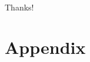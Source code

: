\documentclass[aspectratio=169]{beamer}
\begin{document}
\begin{frame}
    Thanks!
\end{frame}


\appendix

\renewcommand\thetable{\thesection.\arabic{table}} 
\renewcommand\thefigure{\thesection.\arabic{figure}} 
\setcounter{table}{0}
\setcounter{figure}{0}

\section{Appendix}
\end{document}
